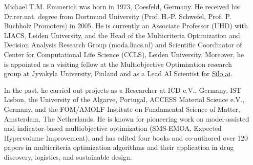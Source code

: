 \documentclass{ieeeaccess}
\begin{document}
\begin{IEEEbiographynophoto}{Michael T.M. Emmerich}
was born in 1973, Coesfeld, Germany. He received his Dr.rer.nat. degree from Dortmund University (Prof. H.-P. Schwefel, Prof. P. Buchholz Promoters) in 2005. He is currently an Associate Professor (UHD) with LIACS, Leiden University, and the Head of the Multicriteria Optimization and Decision Analysis Research Group (moda.liacs.nl) and Scientific Coordinator of Center for Computational Life Science (CCLS), Leiden University. Moreover, he is appointed as a visiting fellow at the Multiobjective Optimization research group at Jyvakyla University, Finland and as a Lead AI Scientist for \url{Silo.ai}.

In the past, he carried out projects as a Researcher at ICD e.V., Germany, IST Lisbon, the University of the Algarve, Portugal, ACCESS Material Science e.V., Germany, and the FOM/AMOLF Institute on Fundamental Science of Matter, Amsterdam, The Netherlands. He is known for pioneering work on model-assisted and indicator-based multiobjective optimization (SMS-EMOA, Expected Hypervolume Improvement), and has edited four books and co-authored over 120 papers in multicriteria optimization algorithms and their application in drug discovery, logistics, and sustainable design.
\end{IEEEbiographynophoto}

\EOD
\end{document}
